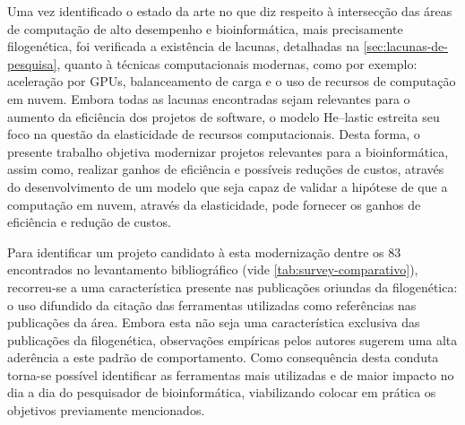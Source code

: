 \documentclass[english,brazilian]{UNISINOSmonografia} %
\begin{document}
Uma vez identificado o estado da arte no que diz respeito à intersecção das áreas de computação de alto desempenho e bioinformática, mais precisamente filogenética, foi verificada a existência de lacunas, detalhadas na \autoref{sec:lacunas-de-pesquisa}, quanto à técnicas computacionais modernas, como por exemplo: aceleração por GPUs, balanceamento de carga e o uso de recursos de computação em nuvem.
Embora todas as lacunas encontradas sejam relevantes para o aumento da eficiência dos projetos de software, o modelo \textsf{He}--lastic estreita seu foco na questão da elasticidade de recursos computacionais.
Desta forma, o presente trabalho objetiva modernizar projetos relevantes para a bioinformática, assim como, realizar ganhos de eficiência e possíveis reduções de custos, através do desenvolvimento de um modelo que seja capaz de validar a hipótese de que a computação em nuvem, através da elasticidade, pode fornecer os ganhos de eficiência e redução de custos.


Para identificar um projeto candidato à esta modernização dentre os 83 encontrados no levantamento bibliográfico (vide \autoref{tab:survey-comparativo}), recorreu-se a uma característica presente nas publicações oriundas da filogenética: o uso difundido da citação das ferramentas utilizadas como referências nas publicações da área.
Embora esta não seja uma característica exclusiva das publicações da filogenética, observações empíricas pelos autores sugerem uma alta aderência a este padrão de comportamento.
Como consequência desta conduta torna-se possível identificar as ferramentas mais utilizadas e de maior impacto no dia a dia do pesquisador de bioinformática, viabilizando colocar em prática os objetivos previamente mencionados.
\end{document}
